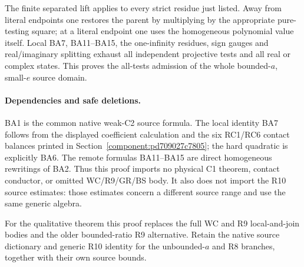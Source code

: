 The finite separated lift applies to every strict residue just listed.
Away from literal endpoints one restores the parent by multiplying by
the appropriate pure-testing square; at a literal endpoint one uses
the homogeneous polynomial value itself. Local BA7, BA11--BA15,
the one-infinity residues, sign gauges and real/imaginary splitting
exhaust all independent projective tests and all real or complex
states. This proves the all-tests admission of the whole bounded-$a$,
small-$e$ source domain.

\paragraph{Dependencies and safe deletions.}
BA1 is the common native weak-C2 source formula. The local identity
BA7 follows from the displayed coefficient calculation and the six
RC1/RC6 contact balances printed in
Section~\ref{component:pd709027c7805}; the hard quadratic is explicitly
BA6. The remote formulas BA11--BA15 are direct homogeneous rewritings
of BA2. Thus this proof imports no physical C1 theorem, contact
conductor, or omitted WC/R9/GR/BS body. It also does not import the
R10 source estimates: those estimates concern a different source
range and use the same generic algebra.

For the qualitative theorem this proof replaces the full WC and R9
local-and-join bodies and the older bounded-ratio R9 alternative.
Retain the native source dictionary and generic R10 identity for the
unbounded-$a$ and R8 branches, together with their own source bounds.

